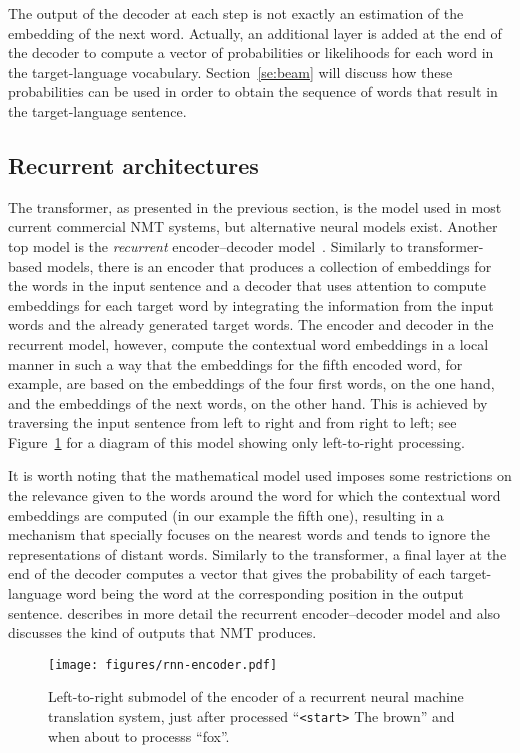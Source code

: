 \documentclass[output=paper,colorlinks,citecolor=brown]{langscibook}
\begin{document}
The output of the decoder at each step is not exactly an estimation of the embedding of the next word. Actually, an additional 
layer is added at the end of the decoder to compute a vector of probabilities 
or likelihoods
for each word in the target-language vocabulary. Section~\ref{se:beam} will discuss how these probabilities can be used in order to obtain the sequence of words that result in the target-language sentence.

\subsection{Recurrent architectures}
\label{se:recurrent}

The transformer, as presented in the previous section, is the model used in most current commercial NMT systems, but alternative neural models exist. Another top model is the \emph{recurrent} encoder--decoder model~\citep{recurrent}. Similarly to transformer-based models, there is an encoder that produces a collection of embeddings for the words in the input sentence and a decoder that uses attention to compute embeddings for each target word by integrating the information from the input words and the already generated target words. The encoder and decoder in the recurrent model, however, compute the contextual word embeddings in  a local manner in such a way that the embeddings for the fifth encoded word, for example, are based on the embeddings of the four first words, on the one hand, and the embeddings of the next words, on the other hand. This is achieved by traversing the input sentence from left to right and from right to left; see Figure~\ref{fg:recurrent} for a diagram of this model  showing only left-to-right processing.

It is worth noting that the mathematical model used imposes some restrictions on the relevance given to the words around the word for which the contextual word embeddings are computed (in our example the fifth one), resulting in a mechanism that specially focuses on the nearest words and tends to ignore the representations of distant words. Similarly to the transformer, a final layer at the end of the decoder computes a vector that gives the probability of each target-language word being the word at the corresponding position in the output sentence. \citet{forcada2017making} describes in more detail the recurrent encoder--decoder model and also discusses the kind of outputs that NMT produces.


\begin{figure}[tb]
\centering
    \texttt{[image: figures/rnn-encoder.pdf]}
\caption{Left-to-right submodel of the encoder of a recurrent neural machine translation 
system, just after processed ``\texttt{<start>} The brown'' and when about to processs ``fox''.}
\label{fg:recurrent}
\end{figure}
\end{document}

